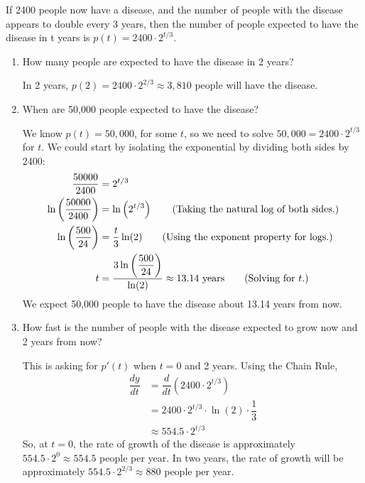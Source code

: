 \begin{example}
If 2400 people now have a disease, and the number of people with the disease appears to double every 3 years, then the number of people expected to have the disease in t years is $p(t)=2400\cdot 2^{t/3}$.
    \begin{enumerate}[label=(\alph*)]
    \item How many people are expected to have the disease in 2 years?

    \begin{solution}
    In 2 years, $p(2)=2400\cdot2^{2/3} \approx 3,810$ people will have the disease.
    \end{solution}
    \item When are 50,000 people expected to have the disease?

    \begin{solution}
    We know $p(t)=50{,}000$, for some $t$, so we need to solve $50{,}000=2400\cdot 2^{t/3}$ for $t$. We could start by isolating the exponential by dividing both sides by 2400:
    \begin{align*}
		\dfrac{50000}{2400} &= 2^{t/3} \\
		\ln\left(\dfrac{50000}{2400}\right) &= \ln\left(2^{t/3}\right) \qquad \text{(Taking the natural log of both sides.)}\\
		\ln\left(\dfrac{500}{24}\right) &= \dfrac{t}{3}\ln(2) \qquad \text{(Using the exponent property for logs.)}\\
		t &= \dfrac{3\ln\left(\dfrac{500}{24}\right)}{\ln(2)}\approx 13.14\text{ years}\qquad \text{(Solving for $ t $.)}
	\end{align*}
We expect 50,000 people to have the disease about 13.14 years from now.
    \end{solution}
    \item How fast is the number of people with the disease expected to grow now and 2 years from now?
    
    \begin{solution} 
This is asking for $p'(t)$ when $t= 0$ and 2 years. Using the Chain Rule,
    \begin{align*}
		\dfrac{dy}{dt} &= \dfrac{d}{dt}\left(2400\cdot 2^{t/3}\right) \\
		&= 2400\cdot 2^{t/3}\cdot \ln(2)\cdot\dfrac{1}{3} \\
		&\approx 554.5\cdot 2^{t/3}
	\end{align*}
So, at $t=0$, the rate of growth of the disease is approximately $554.5\cdot 2^0\approx 554.5$ people per year. In two years, the rate of growth will be approximately $554.5\cdot 2^{2/3}\approx 880$ people per year.
    \end{solution}
    \end{enumerate}
\end{example}

